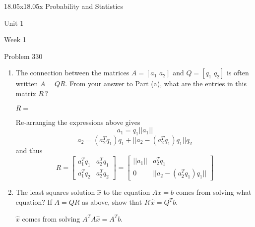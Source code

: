 \begin{edXcourse}{18.05x}{18.05x Probability and Statistics}
\begin{edXchapter}{Unit 1}
\begin{edXsection}{Week 1}
\begin{edXsequential}
\begin{edXproblem}{Problem 3}{30}
\begin{enumerate}
$q_1=$  %

$q_2=$  %


\begin{sol}

\[
q_{1}= \frac{a_1}{ ||a_1||}
\]


\[
q_{2}= \frac{ a_2 - (a_2^T q_1)q_1}{|| a_2 - (a_2^T q_1)q_1||}
= \big( a_2 - \frac{(a_2^T a_1)}{a_1^T a_1} a_1 \big)\, / \, || a_2 - \frac{(a_2^T a_1)}{a_1^T a_1} a_1 ||
\]


\end{sol}

\item The connection between the matrices $A = [a_{1} \, \, a_{2}]$ and
$Q= [q_{1} \, \, q_{2}]$ is often written $A=QR.$ From your answer to 
Part (a), what are the entries in this matrix $R \, ?$

$R=$  %

\begin{sol}
Re-arranging the expressions above gives
$$
a_1 = q_1 ||a_1||
$$
$$
a_2 = (a_2^T q_1) q_1 + ||a_2 - (a_2^T q_1) q_1|| q_2
$$
and thus
$$
R = 
\begin{bmatrix}
a_1^T q_1 & a_2^T q_1 \\
a_1^T q_2 & a_2^T q_2
\end{bmatrix}
=
\begin{bmatrix} 
||a_1|| & a_2^T q_1\\ 
0 &  ||a_2 - (a_2^T q_1) q_1|| 
\end{bmatrix}
$$

\end{sol}

\newpage
\item The least squares solution $\widehat{x}$ to the equation $Ax = b$ 
comes from solving what equation? If $A = QR$ as above, show that $R\,\widehat{x} = Q^{T}b.$

\begin{sol}
$\widehat{x}$ comes from solving $A^T A \widehat{x} = A^T b$. 

 

\end{sol}
\end{enumerate}
\end{edXproblem}
\end{edXsequential}
\end{edXsection}
\end{edXchapter}
\end{edXcourse}
